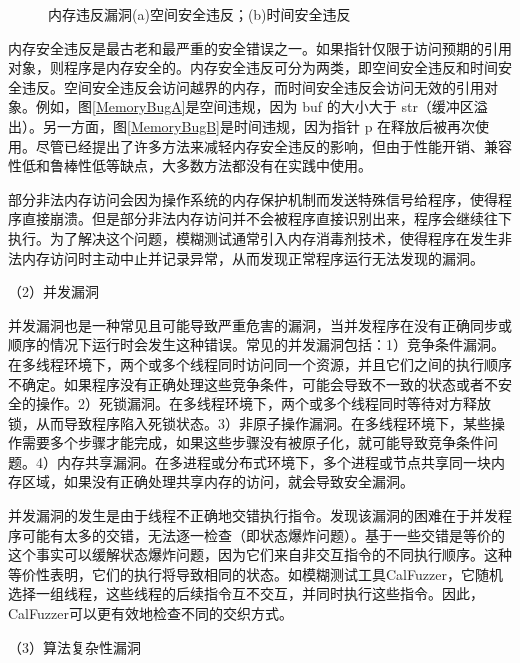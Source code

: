 \documentclass[master]{thesis-uestc}
\begin{document}
\begin{figure}[!htbp]
    \vspace{6pt}
    \caption{内存违反漏洞(a)空间安全违反；(b)时间安全违反}
    \label{MemoryBug}
\end{figure}

内存安全违反是最古老和最严重的安全错误之一。如果指针仅限于访问预期的引用对象，则程序是内存安全的。内存安全违反可分为两类，即空间安全违反和时间安全违反。空间安全违反会访问越界的内存，而时间安全违反会访问无效的引用对象。例如，图\ref{MemoryBugA}是空间违规，因为 buf 的大小大于 str（缓冲区溢出）。另一方面，图\ref{MemoryBugB}是时间违规，因为指针 p 在释放后被再次使用。尽管已经提出了许多方法来减轻内存安全违反的影响，但由于性能开销、兼容性低和鲁棒性低等缺点，大多数方法都没有在实践中使用。

部分非法内存访问会因为操作系统的内存保护机制而发送特殊信号给程序，使得程序直接崩溃。但是部分非法内存访问并不会被程序直接识别出来，程序会继续往下执行。为了解决这个问题，模糊测试通常引入内存消毒剂技术，使得程序在发生非法内存访问时主动中止并记录异常，从而发现正常程序运行无法发现的漏洞。

（2）并发漏洞

并发漏洞也是一种常见且可能导致严重危害的漏洞，当并发程序在没有正确同步或顺序的情况下运行时会发生这种错误。常见的并发漏洞包括：1）竞争条件漏洞。在多线程环境下，两个或多个线程同时访问同一个资源，并且它们之间的执行顺序不确定。如果程序没有正确处理这些竞争条件，可能会导致不一致的状态或者不安全的操作。2）死锁漏洞。在多线程环境下，两个或多个线程同时等待对方释放锁，从而导致程序陷入死锁状态。3）非原子操作漏洞。在多线程环境下，某些操作需要多个步骤才能完成，如果这些步骤没有被原子化，就可能导致竞争条件问题。4）内存共享漏洞。在多进程或分布式环境下，多个进程或节点共享同一块内存区域，如果没有正确处理共享内存的访问，就会导致安全漏洞。

并发漏洞的发生是由于线程不正确地交错执行指令。发现该漏洞的困难在于并发程序可能有太多的交错，无法逐一检查（即状态爆炸问题）。基于一些交错是等价的这个事实可以缓解状态爆炸问题，因为它们来自非交互指令的不同执行顺序。这种等价性表明，它们的执行将导致相同的状态。如模糊测试工具CalFuzzer，它随机选择一组线程，这些线程的后续指令互不交互，并同时执行这些指令。因此，CalFuzzer可以更有效地检查不同的交织方式。

（3）算法复杂性漏洞
\end{document}
